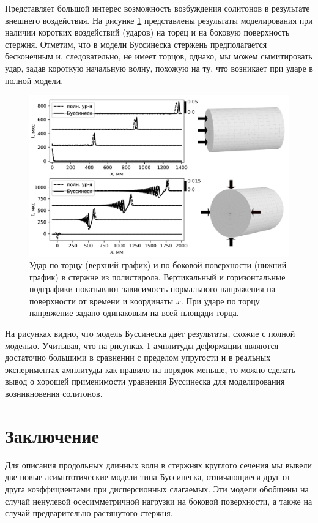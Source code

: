 \documentclass[12pt, a4paper]{article}
\begin{document}
Представляет большой интерес возможность возбуждения солитонов в результате внешнего воздействия. На рисунке \ref{fig:impact} представлены результаты моделирования при наличии коротких воздействий (ударов) на торец и на боковую поверхность стержня. Отметим, что в модели Буссинеска стержень предполагается бесконечным и, следовательно, не имеет торцов, однако, мы можем сымитировать удар, задав короткую начальную волну, похожую на ту, что возникает при ударе в полной модели.
\begin{figure}[h!]
	\centering
	\vspace{-2mm}
	\includegraphics[width=.88\linewidth]{Figures/Impact2Black_mod}
	\caption{Удар по торцу (верхний график) и по боковой поверхности (нижний график) в стержне из полистирола. Вертикальный и горизонтальные подграфики показывают зависимость нормального напряжения на поверхности от времени и координаты $x$. При ударе по торцу напряжение задано одинаковым на всей площади торца.}
	\label{fig:impact}
	\vspace{-2.5mm}
\end{figure}

На рисунках видно, что модель Буссинеска даёт результаты, схожие с полной моделью. Учитывая, что на рисунках \ref{fig:impact} амплитуды деформации являются достаточно большими в сравнении с пределом упругости и в реальных экспериментах амплитуды как правило на порядок меньше, то можно сделать вывод о хорошей применимости уравнения Буссинеска для моделирования возникновения солитонов.


\section{Заключение}

Для описания продольных длинных волн в стержнях круглого сечения мы вывели две новые асимптотические модели типа Буссинеска, отличающиеся друг от друга коэффициентами при дисперсионных слагаемых. Эти модели обобщены на случай ненулевой осесимметричной нагрузки на боковой поверхности, а также на случай предварительно растянутого стержня.
\end{document}
